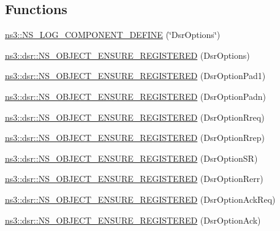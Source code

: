 \subsection*{Functions}
\begin{DoxyCompactItemize}
\item 
\hyperlink{namespacens3_a98bcac6e0d11c571f97dd99bff876ff0}{ns3\+::\+N\+S\+\_\+\+L\+O\+G\+\_\+\+C\+O\+M\+P\+O\+N\+E\+N\+T\+\_\+\+D\+E\+F\+I\+NE} (\char`\"{}Dsr\+Options\char`\"{})
\item 
\hyperlink{namespacens3_1_1dsr_a41b919327c686c03cff149231c9e2d7e}{ns3\+::dsr\+::\+N\+S\+\_\+\+O\+B\+J\+E\+C\+T\+\_\+\+E\+N\+S\+U\+R\+E\+\_\+\+R\+E\+G\+I\+S\+T\+E\+R\+ED} (Dsr\+Options)
\item 
\hyperlink{namespacens3_1_1dsr_a595893a0a36cf23f4e35ae8d5742da5b}{ns3\+::dsr\+::\+N\+S\+\_\+\+O\+B\+J\+E\+C\+T\+\_\+\+E\+N\+S\+U\+R\+E\+\_\+\+R\+E\+G\+I\+S\+T\+E\+R\+ED} (Dsr\+Option\+Pad1)
\item 
\hyperlink{namespacens3_1_1dsr_aea055016900576f5f20fc223169e60fc}{ns3\+::dsr\+::\+N\+S\+\_\+\+O\+B\+J\+E\+C\+T\+\_\+\+E\+N\+S\+U\+R\+E\+\_\+\+R\+E\+G\+I\+S\+T\+E\+R\+ED} (Dsr\+Option\+Padn)
\item 
\hyperlink{namespacens3_1_1dsr_aa0672a0340081736a22ce0c4671f1470}{ns3\+::dsr\+::\+N\+S\+\_\+\+O\+B\+J\+E\+C\+T\+\_\+\+E\+N\+S\+U\+R\+E\+\_\+\+R\+E\+G\+I\+S\+T\+E\+R\+ED} (Dsr\+Option\+Rreq)
\item 
\hyperlink{namespacens3_1_1dsr_a4575f60ebce3dc92b73d1add70ac6ced}{ns3\+::dsr\+::\+N\+S\+\_\+\+O\+B\+J\+E\+C\+T\+\_\+\+E\+N\+S\+U\+R\+E\+\_\+\+R\+E\+G\+I\+S\+T\+E\+R\+ED} (Dsr\+Option\+Rrep)
\item 
\hyperlink{namespacens3_1_1dsr_a5f2f82105cbade2fef462e6ecd4cd54a}{ns3\+::dsr\+::\+N\+S\+\_\+\+O\+B\+J\+E\+C\+T\+\_\+\+E\+N\+S\+U\+R\+E\+\_\+\+R\+E\+G\+I\+S\+T\+E\+R\+ED} (Dsr\+Option\+SR)
\item 
\hyperlink{namespacens3_1_1dsr_a468914875c234b96e3d47f59fcc92c81}{ns3\+::dsr\+::\+N\+S\+\_\+\+O\+B\+J\+E\+C\+T\+\_\+\+E\+N\+S\+U\+R\+E\+\_\+\+R\+E\+G\+I\+S\+T\+E\+R\+ED} (Dsr\+Option\+Rerr)
\item 
\hyperlink{namespacens3_1_1dsr_aab3f5eeb90707df00a8bf33605cd93da}{ns3\+::dsr\+::\+N\+S\+\_\+\+O\+B\+J\+E\+C\+T\+\_\+\+E\+N\+S\+U\+R\+E\+\_\+\+R\+E\+G\+I\+S\+T\+E\+R\+ED} (Dsr\+Option\+Ack\+Req)
\item 
\hyperlink{namespacens3_1_1dsr_abd02085539a3b51a6e0e236b694ac560}{ns3\+::dsr\+::\+N\+S\+\_\+\+O\+B\+J\+E\+C\+T\+\_\+\+E\+N\+S\+U\+R\+E\+\_\+\+R\+E\+G\+I\+S\+T\+E\+R\+ED} (Dsr\+Option\+Ack)
\end{DoxyCompactItemize}


